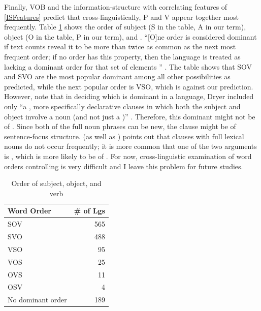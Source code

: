 Finally, VOB and the information-structure  with correlating features of  \ref{ISFeatures} predict that
cross-linguistically,
P and V appear together most frequently.
Table \ref{wals-81} shows the order of subject (S in the table, A in our term), object (O in the table, P in our term), and  \cite{wals-81}.
``[O]ne order is considered dominant if text counts reveal it to be more than twice as common as the next most frequent order; if no order has this property, then the language is treated as lacking a dominant order for that set of elements '' \cite{wals-s6}.
The table shows that
SOV and SVO are the most popular dominant  among all other possibilities as predicted,
while the next popular order is VSO,
which is against our prediction.
However, note that in deciding which  is dominant in a language,
Dryer included only
``a , more specifically declarative clauses in which both the subject and object involve a noun (and not just a )'' \cite{wals-81}.
Therefore, this dominant  might not be of .
Since both of the full noun phrases can be new,
the clause might be of sentence-focus structure.
 (as well as ) points out that
 clauses with full lexical nouns do not occur frequently;
it is more common that
one of the two arguments is ,
which is more likely to be of .
For now,
cross-linguistic examination of word orders controlling  is very difficult
and I leave this problem for future studies.

\begin{table}
\centering
\caption{Order of subject, object, and verb \cite{wals-81}}
\label{wals-81}
\begin{tabular}{lr}
	\toprule
	Word Order & \# of Lgs \\
	\midrule
	SOV &	565 \\
	SVO &	488 \\
	VSO &	95 \\
	VOS &	25 \\
	OVS &	11 \\
	OSV &	4 \\
	No dominant order &	189 \\
	\bottomrule
\end{tabular}
\end{table}



